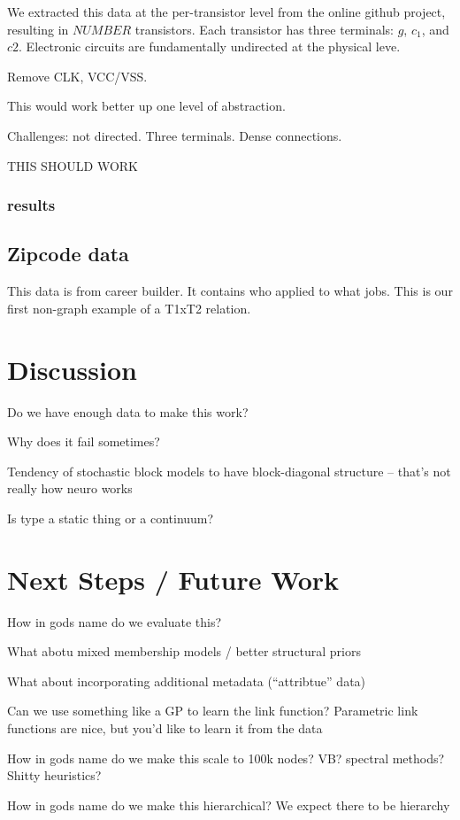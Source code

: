 \documentclass{article}
\begin{document}
We extracted this data at the per-transistor level from the online
github project, resulting in $NUMBER$ transistors. Each transistor has
three terminals: $g$, $c_1$, and $c2$. Electronic circuits are fundamentally
undirected at the physical leve. 

Remove CLK, VCC/VSS. 

This would work better up one level of abstraction. 


Challenges: not directed. Three terminals. Dense connections. 

THIS SHOULD WORK

\subsubsection{results}

\subsection{Zipcode data}

This data is from career builder. It contains who applied to what
jobs. This is our first non-graph example of a T1xT2 relation.


\section{Discussion}
Do we have enough data to make this work? 

Why does it fail sometimes? 

Tendency of stochastic block models to have block-diagonal structure -- that's not really how neuro works

Is type a static thing or a continuum? 


\section{Next Steps / Future Work}
How in gods name do we evaluate this? 

What abotu mixed membership models / better structural priors

What about incorporating additional metadata (``attribtue'' data)

Can we use something like a GP to learn the link function? 
Parametric link functions are nice, but you'd like to learn it from the data

How in gods name do we make this scale to 100k nodes? 
VB? spectral methods? Shitty heuristics? 

How in gods name do we make this hierarchical? 
We expect there to be hierarchy 

\printbibliography
\end{document}
